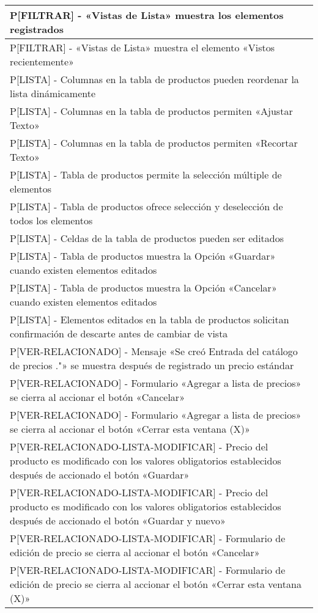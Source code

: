 \begin{longtable}{|p{15.0cm}|}
P[FILTRAR] - «Vistas de Lista» muestra los elementos registrados \\ \hline
P[FILTRAR] - «Vistas de Lista» muestra el elemento «Vistos recientemente» \\ \hline
P[LISTA] - Columnas en la tabla de productos pueden reordenar la lista dinámicamente \\ \hline
P[LISTA] - Columnas en la tabla de productos permiten «Ajustar Texto» \\ \hline
P[LISTA] - Columnas en la tabla de productos permiten «Recortar Texto» \\ \hline
P[LISTA] - Tabla de productos permite la selección múltiple de elementos \\ \hline
P[LISTA] - Tabla de productos ofrece selección y deselección de todos los elementos \\ \hline
P[LISTA] - Celdas de la tabla de productos pueden ser editados \\ \hline
P[LISTA] - Tabla de productos muestra la Opción «Guardar» cuando existen elementos editados \\ \hline
P[LISTA] - Tabla de productos muestra la Opción «Cancelar» cuando existen elementos editados \\ \hline
P[LISTA] - Elementos editados en la tabla de productos solicitan confirmación de descarte antes de cambiar de vista \\ \hline
P[VER-RELACIONADO] - Mensaje «Se creó Entrada del catálogo de precios ."» se muestra después de registrado un precio estándar \\ \hline
P[VER-RELACIONADO] - Formulario «Agregar a lista de precios» se cierra al accionar el botón «Cancelar» \\ \hline
P[VER-RELACIONADO] - Formulario «Agregar a lista de precios» se cierra al accionar el botón «Cerrar esta ventana (X)» \\ \hline
P[VER-RELACIONADO-LISTA-MODIFICAR] - Precio del producto es modificado con los valores obligatorios establecidos después de accionado el botón «Guardar» \\ \hline
P[VER-RELACIONADO-LISTA-MODIFICAR] - Precio del producto es modificado con los valores obligatorios establecidos después de accionado el botón «Guardar y nuevo» \\ \hline
P[VER-RELACIONADO-LISTA-MODIFICAR] - Formulario de edición de precio se cierra al accionar el botón «Cancelar» \\ \hline
P[VER-RELACIONADO-LISTA-MODIFICAR] - Formulario de edición de precio se cierra al accionar el botón «Cerrar esta ventana (X)» \\ \hline

\end{longtable}
